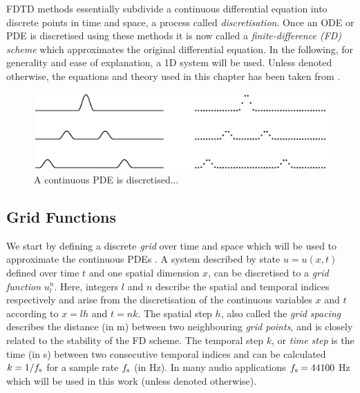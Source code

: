 
FDTD methods essentially subdivide a continuous differential equation into discrete points in time and space, a process called \textit{discretisation}. Once an ODE or PDE is discretised using these methods it is now called a \textit{finite-difference (FD) scheme} which approximates the original differential equation. In the following, for generality and ease of explanation, a 1D system will be used. Unless denoted otherwise, the equations and theory used in this chapter has been taken from \cite{theBible}.

\begin{figure}[h]
    \centering
    \includegraphics[width=\textwidth]{figures/fdtd/gridFigure.eps}
    \caption{\label{fig:discretisation} A continuous PDE is discretised... }
\end{figure}

\subsection{Grid Functions } \label{sec:gridFunctions}
We start by defining a discrete \textit{grid} over time and space which will be used to approximate the continuous PDEs . A system described by state $u = u(x,t)$ defined over time $t$ and one spatial dimension $x$, can be discretised to a \textit{grid function} $u_l^n$. Here, integers $l$ and $n$ describe the spatial and temporal indices respectively and arise from the discretisation of the continuous variables $x$ and $t$ according to $x=lh$ and $t=nk$. The spatial step $h$, also called the \textit{grid spacing} describes the distance (in m) between two neighbouring \textit{grid points}, and is closely related to the stability of the FD scheme. The temporal step $k$, or \textit{time step} is the time (in s) between two consecutive temporal indices and can be calculated $k=1/f_\text{s}$ for a sample rate $f_\text{s}$ (in Hz). In many audio applications $f_\text{s} = 44100$ Hz which will be used in this work (unless denoted otherwise).

